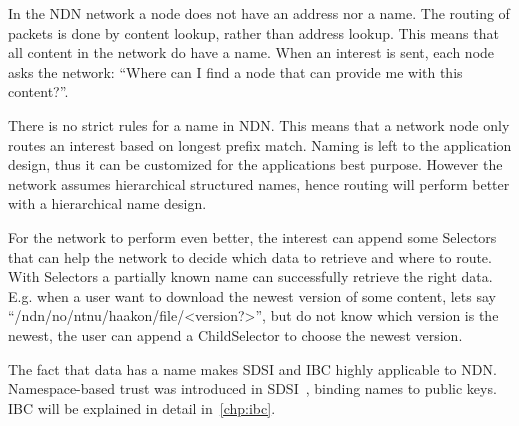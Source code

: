 In the \gls{NDN} network a \gls{node} does not have an address nor a \gls{name}.
The routing of packets is done by content lookup, rather than address lookup.
This means that all content in the network do have a \gls{name}.
When an \gls{interest} is sent, each \gls{node} asks the network: ``Where can I find a node that can provide me with this content?''.

There is no strict rules for a \gls{name} in \gls{NDN}.
This means that a network \gls{node} only routes an \gls{interest} based on longest prefix match.
Naming is left to the application design, thus it can be customized for the applications best purpose.
However the network assumes hierarchical structured names, hence routing will perform better with a hierarchical \gls{name} design.

For the network to perform even better, the \gls{interest} can append some Selectors that can help the network to decide which \gls{data} to retrieve and where to route.
With Selectors a partially known \gls{name} can successfully retrieve the right \gls{data}.
E.g. when a user want to download the newest version of some content, lets say ``/ndn/no/ntnu/haakon/file/<version?>'', but do not know which version is the newest, the user can append a ChildSelector to choose the newest version.

The fact that \gls{data} has a \gls{name} makes \gls{SDSI} and \gls{IBC} highly applicable to \gls{NDN}.
Namespace-based trust was introduced in \gls{SDSI}~\cite{rivest1996sdsi}, binding names to public keys.
\gls{IBC} will be explained in detail in~\autoref{chp:ibc}.

